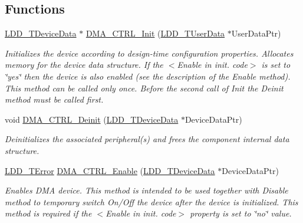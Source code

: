 \subsection*{Functions}
\begin{DoxyCompactItemize}
\item 
\hyperlink{group___p_e___types__module_gac5cf1362f1f0e3a2ce71b1bf2276d091}{L\-D\-D\-\_\-\-T\-Device\-Data} $\ast$ \hyperlink{group___d_m_a___c_t_r_l__module_ga553f7520948665feb02a5442ce5fb2cc}{D\-M\-A\-\_\-\-C\-T\-R\-L\-\_\-\-Init} (\hyperlink{group___p_e___types__module_ga0b66a73f87238a782318aa0be7578e35}{L\-D\-D\-\_\-\-T\-User\-Data} $\ast$User\-Data\-Ptr)
\begin{DoxyCompactList}\small\item\em Initializes the device according to design-\/time configuration properties. Allocates memory for the device data structure. If the $<$Enable in init. code$>$ is set to \char`\"{}yes\char`\"{} then the device is also enabled (see the description of the Enable method). This method can be called only once. Before the second call of Init the Deinit method must be called first. \end{DoxyCompactList}\item 
void \hyperlink{group___d_m_a___c_t_r_l__module_ga6e343d81dce77f34b1f1307c78674eae}{D\-M\-A\-\_\-\-C\-T\-R\-L\-\_\-\-Deinit} (\hyperlink{group___p_e___types__module_gac5cf1362f1f0e3a2ce71b1bf2276d091}{L\-D\-D\-\_\-\-T\-Device\-Data} $\ast$Device\-Data\-Ptr)
\begin{DoxyCompactList}\small\item\em Deinitializes the associated peripheral(s) and frees the component internal data structure. \end{DoxyCompactList}\item 
\hyperlink{group___p_e___types__module_ga24c2b045fd04e79e85f261ce4df35588}{L\-D\-D\-\_\-\-T\-Error} \hyperlink{group___d_m_a___c_t_r_l__module_ga97900786e1447569fa5f6b5f132f37cf}{D\-M\-A\-\_\-\-C\-T\-R\-L\-\_\-\-Enable} (\hyperlink{group___p_e___types__module_gac5cf1362f1f0e3a2ce71b1bf2276d091}{L\-D\-D\-\_\-\-T\-Device\-Data} $\ast$Device\-Data\-Ptr)
\begin{DoxyCompactList}\small\item\em Enables D\-M\-A device. This method is intended to be used together with Disable method to temporary switch On/\-Off the device after the device is initialized. This method is required if the $<$Enable in init. code$>$ property is set to \char`\"{}no\char`\"{} value. \end{DoxyCompactList}\item 

\end{DoxyCompactItemize}
